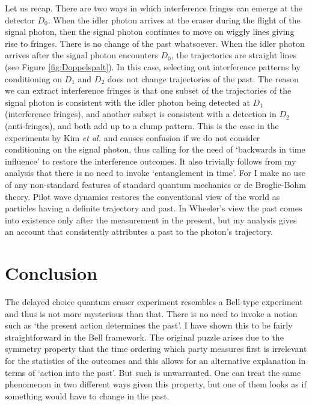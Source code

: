 \documentclass[11pt]{article}
\numberwithin{equation}{section}
\begin{document}
Let us recap. There are two ways in which interference fringes can emerge at the detector $D_0$. When the idler photon arrives at the eraser during the flight of the signal photon, then the signal photon continues to move on wiggly lines giving rise to fringes. There is no change of the past whatsoever. When the idler photon arrives after the signal photon encounters $D_0$, the trajectories are straight lines (see Figure \ref{fig:Doppelspalt}). In this case, selecting out interference patterns by conditioning on $D_1$ and $D_2$ does not change trajectories of the past. The reason we can extract interference fringes is that one subset of the trajectories of the signal photon is consistent with the idler photon being detected at $D_1$ (interference fringes), and another subset is consistent with a detection in $D_2$ (anti-fringes), and both add up to a clump pattern. This is the case in the experiments by Kim \textit{et al.} and causes confusion if we do not consider conditioning on the signal photon, thus calling for the need of `backwards in time influence' to restore the interference outcomes. It also trivially follows from my analysis that there is no need to invoke `entanglement in time'. For I make no use of any non-standard features of standard quantum mechanics or de Broglie-Bohm theory. Pilot wave dynamics restores the conventional view of the world as particles having a definite trajectory and past. In Wheeler's view the past comes into existence only after the measurement in the present, but my analysis gives an account that consistently attributes a past to the photon's trajectory. 




\section{Conclusion}

The delayed choice quantum eraser experiment resembles a Bell-type experiment and thus is not more mysterious than that. 
There is no need to invoke a notion such as `the present action determines the past'. I have shown this to be fairly straightforward in the Bell framework. The original puzzle arises due to the symmetry property that the time ordering which party measures first is irrelevant for the statistics of the outcomes and this allows for an alternative explanation in terms of `action into the past'. But such is unwarranted. One can treat the same phenomenon in two different ways given this property, but one of them  looks as if something would have to change in the past.  
\end{document}
